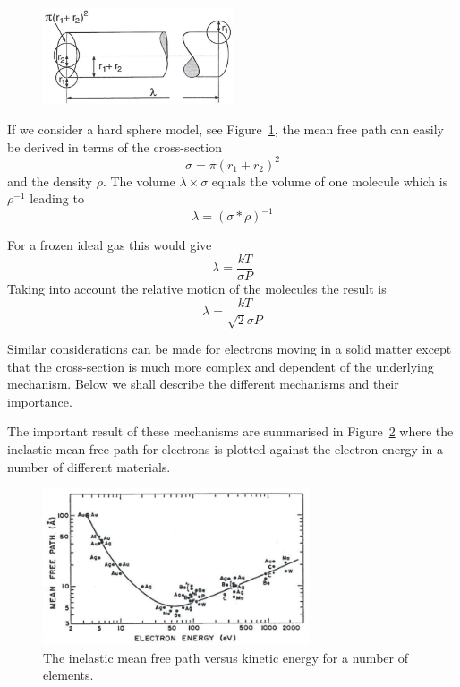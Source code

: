 \begin{figure}[htbp]
\centering
\includegraphics[width=0.5\textwidth]{figures/02_05}
\caption{ }
\label{fig:sphere_model}
\end{figure}

If we consider a hard sphere model, see Figure~\ref{fig:sphere_model}, the mean free path can easily be derived in terms of the cross-section 
\begin{equation}
\sigma = \pi (r_{1}+r_{2})^{2}
\end{equation}
and the density $\rho$. The volume $\lambda \times \sigma$ equals the volume of one molecule which is $\rho^{-1}$ leading to
\begin{equation}
\lambda = (\sigma*\rho)^{-1}
\end{equation}

For a frozen ideal gas this would give
\begin{equation}
\lambda = \frac{kT}{\sigma P}
\end{equation}
Taking into account the relative motion of the molecules the result is
\begin{equation}
\lambda = \frac{kT}{\sqrt{2} \sigma P}
\end{equation}

Similar considerations can be made for electrons moving in a solid matter except that the cross-section is much more complex and dependent of the underlying mechanism. Below we shall describe the different mechanisms and their importance.

The important result of these mechanisms are summarised in Figure~\ref{fig:mean_free_path} where the inelastic mean free path for electrons is plotted against the electron energy in a number of different materials.

\begin{figure}[htbp]
\centering
\includegraphics[width=0.7\textwidth]{figures/02_06}
\caption{The inelastic mean free path versus kinetic energy for a number of elements.}
\label{fig:mean_free_path}
\end{figure}


